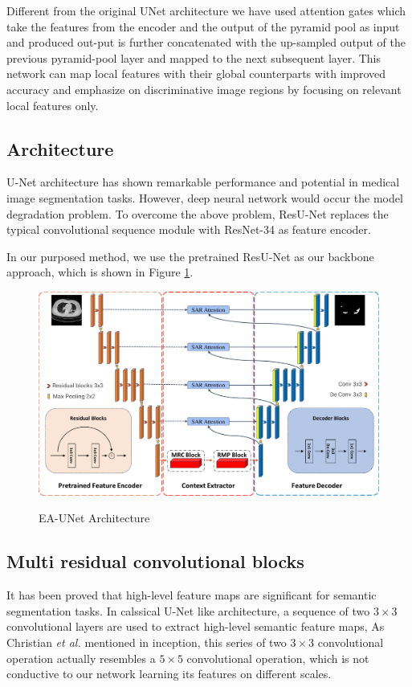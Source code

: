 \documentclass{ieeeaccess}
\begin{document}
  
  Different from the original UNet architecture we have used attention gates which take the features from the encoder and the output of the pyramid pool as input and produced out-put is further concatenated with the up-sampled output of the previous pyramid-pool layer and mapped to the next subsequent layer. This network can map local features with their global counterparts with improved accuracy and emphasize on discriminative image regions by focusing on relevant local features only.
  
  \subsection{Architecture}
  U-Net\cite{unet} architecture has shown remarkable performance and potential in medical image segmentation tasks. 
  However, deep neural network would occur the model degradation problem. To overcome the above problem, ResU-Net replaces the typical convolutional sequence module with ResNet-34 \cite{HeZRS16} as feature encoder.
  
  In our purposed method, we use the pretrained ResU-Net\cite{ResUNet} as our backbone approach, which is shown in Figure \ref{fig:overview}.
  
  \begin{figure}[htbp]
  \small
  \centering
  \includegraphics[width=1\textwidth]{figure/overview.pdf}
  \label{fig:overview}
  \caption{EA-UNet Architecture}
  \end{figure}
  
  \subsection{Multi residual convolutional blocks}
  It has been proved that high-level feature maps are significant for semantic segmentation tasks. In calssical U-Net like architecture, a sequence of two \(3\times 3\) convolutional layers are used to extract high-level semantic feature maps,
  As Christian \emph{et al.} mentioned in inception\cite{SzegedyVISW16},  this series of two $3 \times 3$ convolutional operation actually resembles a $5 \times 5$ convolutional operation, which is not conductive to our network 
  learning its features on different scales.
  
\end{document}

